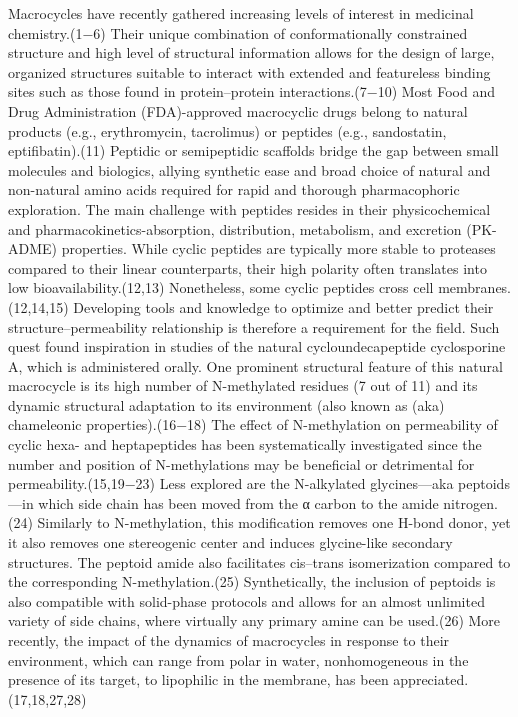 Macrocycles have recently gathered increasing levels of interest in medicinal chemistry.(1−6) Their unique combination of conformationally constrained structure and high level of structural information allows for the design of large, organized structures suitable to interact with extended and featureless binding sites such as those found in protein–protein interactions.(7−10) Most Food and Drug Administration (FDA)-approved macrocyclic drugs belong to natural products (e.g., erythromycin, tacrolimus) or peptides (e.g., sandostatin, eptifibatin).(11) Peptidic or semipeptidic scaffolds bridge the gap between small molecules and biologics, allying synthetic ease and broad choice of natural and non-natural amino acids required for rapid and thorough pharmacophoric exploration. The main challenge with peptides resides in their physicochemical and pharmacokinetics-absorption, distribution, metabolism, and excretion (PK-ADME) properties. While cyclic peptides are typically more stable to proteases compared to their linear counterparts, their high polarity often translates into low bioavailability.(12,13) Nonetheless, some cyclic peptides cross cell membranes.(12,14,15) Developing tools and knowledge to optimize and better predict their structure–permeability relationship is therefore a requirement for the field. Such quest found inspiration in studies of the natural cycloundecapeptide cyclosporine A, which is administered orally. One prominent structural feature of this natural macrocycle is its high number of N-methylated residues (7 out of 11) and its dynamic structural adaptation to its environment (also known as (aka) chameleonic properties).(16−18) The effect of N-methylation on permeability of cyclic hexa- and heptapeptides has been systematically investigated since the number and position of N-methylations may be beneficial or detrimental for permeability.(15,19−23) Less explored are the N-alkylated glycines—aka peptoids—in which side chain has been moved from the α carbon to the amide nitrogen.(24) Similarly to N-methylation, this modification removes one H-bond donor, yet it also removes one stereogenic center and induces glycine-like secondary structures. The peptoid amide also facilitates cis–trans isomerization compared to the corresponding N-methylation.(25) Synthetically, the inclusion of peptoids is also compatible with solid-phase protocols and allows for an almost unlimited variety of side chains, where virtually any primary amine can be used.(26) More recently, the impact of the dynamics of macrocycles in response to their environment, which can range from polar in water, nonhomogeneous in the presence of its target, to lipophilic in the membrane, has been appreciated.(17,18,27,28)
